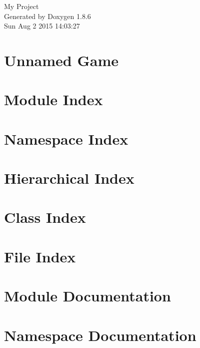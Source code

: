 \documentclass[twoside]{book}
\newcommand{\clearemptydoublepage}{%
  \newpage{\pagestyle{empty}\cleardoublepage}%
}
\begin{document}
\hypersetup{pageanchor=false}
\begin{titlepage}
\vspace*{7cm}
\begin{center}%
{\Large My Project }\\
\vspace*{1cm}
{\large Generated by Doxygen 1.8.6}\\
\vspace*{0.5cm}
{\small Sun Aug 2 2015 14:03:27}\\
\end{center}
\end{titlepage}
\clearemptydoublepage
\tableofcontents
\clearemptydoublepage
{}
\hypersetup{pageanchor=true}

\chapter{Unnamed Game}
\label{index}\hypertarget{index}{}
\chapter{Module Index}

\chapter{Namespace Index}

\chapter{Hierarchical Index}

\chapter{Class Index}

\chapter{File Index}

\chapter{Module Documentation}





\chapter{Namespace Documentation}







\end{document}
